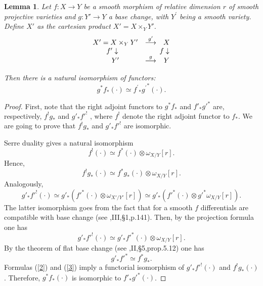 \documentclass[12pt]{article}
\newtheorem{lemma}[theorem]{Lemma}
\begin{document}
\begin{lemma}\label{isof}
Let $f: X\to Y $ be a smooth morphism of relative dimension $r$ of smooth projective varieties and $ g:Y'\to Y $  a base change, with
$Y^{\prime}$ being a smooth variety. Define $X'$ as the cartesian product $X'=X\times_Y Y'$.
$$
\begin{array}{ccc}
X^{\prime}=X\times_Y Y^{\prime}& \stackrel{ g'}{\longrightarrow}& X\\      
\llap{$f'$}\downarrow &&
\llap{$f$}\downarrow \\
Y'&\stackrel{g}{\longrightarrow}& Y\\
\end{array}
$$

Then there is a natural isomorphism of functors:
$$
g^*f_*(\cdot) \simeq {f^{\prime}}_* {g^{\prime}}^*(\cdot).
$$
\end{lemma}
\begin{proof}
First, note that the right adjoint functors to $g^*f_*$ and $ f'_* g'^*$ are, respectively, $f^{!}g_*$ and $g'_*f'^!$ , where $f^!$ denote the right adjoint functor to $f_*$. We are going to prove that $f^{!}g_*$ and $g'_*f'^!$ are isomorphic.

Serre duality gives a natural isomorphism
\begin{equation}\label{1}
f^!(\cdot)\simeq f^*(\cdot)\otimes \omega_{X/Y}[r].
\end{equation}
Hence,
\begin{equation}\label{2}
f^!g_*(\cdot)\simeq f^*g_*(\cdot)\otimes \omega_{X/Y}[r].
\end{equation}
Analogously,
$$
g'_*f'^!(\cdot)\simeq g'_*(f'^*(\cdot)\otimes \omega_{X'/Y'}[r])\simeq g'_*(f'^*(\cdot)\otimes g'^*\omega_{X/Y}[r]).
$$
The latter isomorphism goes from the fact that for a smooth $f$ differentials are compatible with base change (see \cite{H},III,\S1,p.141).
Then, by the projection formula one has
\begin{equation}\label{3}
g'_* f'^!(\cdot)\simeq g'_* f'^*(\cdot)\otimes \omega_{X/Y}[r].
\end{equation}
By the theorem of flat base change (see \cite{H},II,\S5,prop.5.12) one has
$$
g'_* f'^*\simeq f^*g_*.
$$
Formulas (\ref{2}) and (\ref{3}) imply a functorial isomorphism of $g'_* f'^!(\cdot)$ and $f^! g_*(\cdot)$.
Therefore, $g^*f_*(\cdot)$ is isomorphic to $f'_* g'^*(\cdot)
$.
\end{proof}
\bigskip
\end{document}
